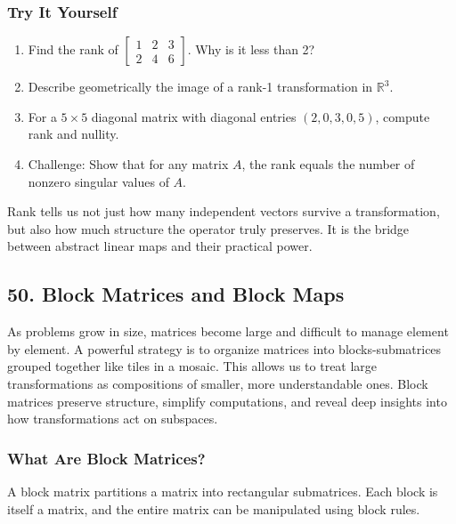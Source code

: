 \documentclass[
  letterpaper,
  DIV=11,
  numbers=noendperiod]{scrreprt}
\providecommand{\tightlist}{%
  \setlength{\itemsep}{0pt}\setlength{\parskip}{0pt}}
\begin{document}
\subsubsection{Try It Yourself}\label{try-it-yourself-48}

\begin{enumerate}
\def\labelenumi{\arabic{enumi}.}
\tightlist
\item
  Find the rank of
  \(\begin{bmatrix} 1 & 2 & 3 \\ 2 & 4 & 6 \end{bmatrix}\). Why is it
  less than 2?
\item
  Describe geometrically the image of a rank-1 transformation in
  \(\mathbb{R}^3\).
\item
  For a \(5 \times 5\) diagonal matrix with diagonal entries
  \((2,0,3,0,5)\), compute rank and nullity.
\item
  Challenge: Show that for any matrix \(A\), the rank equals the number
  of nonzero singular values of \(A\).
\end{enumerate}

Rank tells us not just how many independent vectors survive a
transformation, but also how much structure the operator truly
preserves. It is the bridge between abstract linear maps and their
practical power.

\subsection{50. Block Matrices and Block
Maps}\label{block-matrices-and-block-maps}

As problems grow in size, matrices become large and difficult to manage
element by element. A powerful strategy is to organize matrices into
blocks-submatrices grouped together like tiles in a mosaic. This allows
us to treat large transformations as compositions of smaller, more
understandable ones. Block matrices preserve structure, simplify
computations, and reveal deep insights into how transformations act on
subspaces.

\subsubsection{What Are Block Matrices?}\label{what-are-block-matrices}

A block matrix partitions a matrix into rectangular submatrices. Each
block is itself a matrix, and the entire matrix can be manipulated using
block rules.
\end{document}
